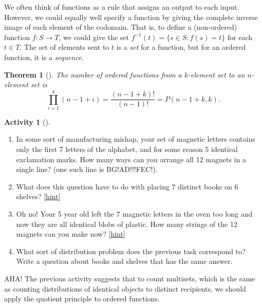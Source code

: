 \documentclass[10pt,]{book}
\theoremstyle{plain}
\newtheorem{theorem}{Theorem}[section]
\theoremstyle{definition}
\theoremstyle{definition}
\theoremstyle{definition}
\newtheorem{activity}[project]{Activity}
\numberwithin{equation}{chapter}
\def\inv{^{-1}}
\def\st{:}
\begin{document}
\par
\hypertarget{p-841}{}%
We often think of functions as a rule that assigns an output to each input.  However, we could equally well specify a function by giving the complete inverse image of each element of the codomain.  That is, to define a (non-ordered) function \(f:S \to T\), we could give the set \(f\inv(t) = \{s \in S \st f(s) = t\}\) for each \(t \in T\).  The set of elements sent to \(t\) is a \emph{set} for a function, but for an ordered function, it is a \emph{sequence}.%
\begin{theorem}[{}]\label{theorem-12}
\hypertarget{p-842}{}%
The number of ordered functions from a \(k\)-element set to an \(n\)-element set is%
\begin{equation*}
\prod_{i=1}^k (n-1+i) = \frac{(n-1+k)!}{(n-1)!} = P(n-1+k, k).
\end{equation*}
%
\end{theorem}
\begin{activity}[]\label{activity-118}
\leavevmode%
\begin{enumerate}[font=\bfseries,label=(\alph*),ref=\alph*]
\item\label{task-167} \hypertarget{p-843}{}%
In some sort of manufacturing mishap, your set of magnetic letters contains only the first 7 letters of the alphabet, and for some reason 5 identical exclamation marks.  How many ways can you arrange all 12 magnets in a single line?  (one such line is BG!AD!!!FEC!).%
\item\label{task-168} \hypertarget{p-844}{}%
What does this question have to do with placing \(7\) distinct books on \(6\) shelves?%
\hfill{\tiny\hyperlink{a-125.b}{[hint]}\hypertarget{q-125.b}{}}\item\label{task-169} \hypertarget{p-846}{}%
Oh no! Your 5 year old left the 7 magnetic letters in the oven too long and now they are all identical blobs of plastic.  How many strings of the 12 magnets can you make now?%
\hfill{\tiny\hyperlink{a-125.c}{[hint]}\hypertarget{q-125.c}{}}\item\label{task-170} \hypertarget{p-848}{}%
What sort of distribution problem does the previous task correspond to?  Write a question about books and shelves that has the same answer.%
\end{enumerate}
\end{activity}
\hypertarget{p-849}{}%
AHA!  The previous activity suggests that to count multisets, which is the same as counting distributions of identical objects to distinct recipients, we should apply the quotient principle to ordered functions.%
\end{document}
